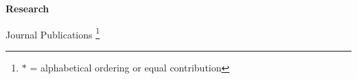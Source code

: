 \documentclass{article}
\begin{document}


\vspace{5mm}
\begin{large}
\noindent \textbf{Research}
\end{large}
\vspace{5mm}


\begin{large}
\noindent Journal Publications \footnote{$\ast$ = alphabetical ordering or equal contribution}
\end{large}
\end{document}
